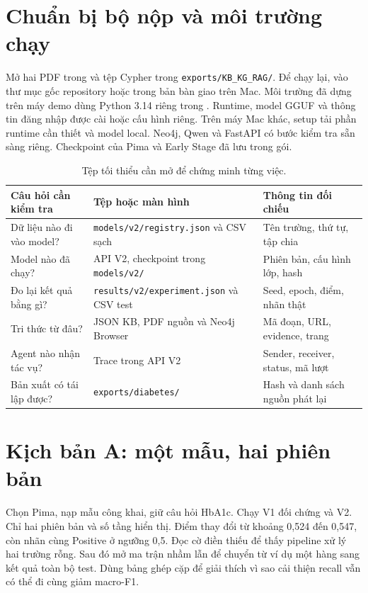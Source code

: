 \section{Chuẩn bị bộ nộp và môi trường chạy}
Mở hai PDF trong  và tệp Cypher trong \nolinkurl{exports/KB_KG_RAG/}. Để chạy lại, vào thư mục gốc repository hoặc  trong bản bàn giao trên Mac. Môi trường đã dựng trên máy demo dùng Python 3.14 riêng trong . Runtime, model GGUF và thông tin đăng nhập được cài hoặc cấu hình riêng. Trên máy Mac khác, setup tải phần runtime cần thiết và model local. Neo4j, Qwen và FastAPI có bước kiểm tra sẵn sàng riêng. Checkpoint của Pima và Early Stage đã lưu trong gói.

\begin{table}[H]\centering\small{}
\caption{Tệp tối thiểu cần mở để chứng minh từng việc.}
\begin{tabular}{P{4cm}P{5.6cm}P{4.6cm}}\toprule
Câu hỏi cần kiểm tra & Tệp hoặc màn hình & Thông tin đối chiếu\\\midrule
Dữ liệu nào đi vào model? & \nolinkurl{models/v2/registry.json} và CSV sạch & Tên trường, thứ tự, tập chia\\
Model nào đã chạy? & API V2, checkpoint trong \nolinkurl{models/v2/} & Phiên bản, cấu hình lớp, hash\\
Đo lại kết quả bằng gì? & \nolinkurl{results/v2/experiment.json} và CSV test & Seed, epoch, điểm, nhãn thật\\
Tri thức từ đâu? & JSON KB, PDF nguồn và Neo4j Browser & Mã đoạn, URL, evidence, trang\\
Agent nào nhận tác vụ? & Trace trong API V2 & Sender, receiver, status, mã lượt\\
Bản xuất có tái lập được? & \nolinkurl{exports/diabetes/} & Hash và danh sách nguồn phát lại\\\bottomrule
\end{tabular}
\end{table}

\section{Kịch bản A: một mẫu, hai phiên bản}
Chọn Pima, nạp mẫu công khai, giữ câu hỏi HbA1c. Chạy V1 đối chứng và V2. Chỉ hai phiên bản và số tầng hiển thị. Điểm thay đổi từ khoảng 0,524 đến 0,547, còn nhãn cùng Positive ở ngưỡng 0,5. Đọc cờ điền thiếu để thấy pipeline xử lý hai trường rỗng. Sau đó mở ma trận nhầm lẫn để chuyển từ ví dụ một hàng sang kết quả toàn bộ test. Dùng bảng ghép cặp để giải thích vì sao cải thiện recall vẫn có thể đi cùng giảm macro-F1.

